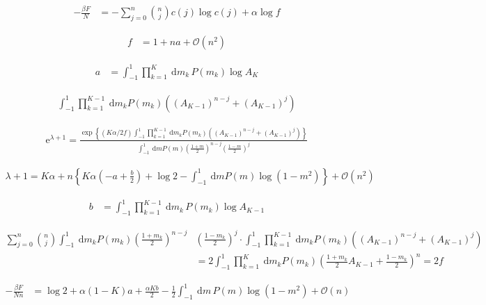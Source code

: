 \documentclass{article}
\begin{document}
\begin{align*}
-\frac{\beta F}{N} &= -\sum_{j=0}^{n} \binom{n}{j} c(j) \log c(j) + \alpha \log f
\tag{D.15}
\end{align*}

\begin{align*}
f &= 1 + n a + \mathcal{O}(n^{2})
\tag{D.16}
\end{align*}

\begin{align*}
a &= \int_{-1}^{1} \prod_{k=1}^{K} \mathrm{~d} m_{k} \, P(m_{k}) \log A_{K}
\tag{D.17}
\end{align*}

\begin{align*}
\int_{-1}^{1} \prod_{k=1}^{K-1} \mathrm{~d} m_{k} P\left(m_{k}\right)\left(\left(A_{K-1}\right)^{n-j}+\left(A_{K-1}\right)^{j}\right) \tag{D.18}
\end{align*}

\begin{align*}
\mathrm{e}^{\lambda+1}=\frac{\exp \left\{(K \alpha / 2 f) \int_{-1}^{1} \prod_{k=1}^{K-1} \mathrm{~d} m_{k} P\left(m_{k}\right)\left(\left(A_{K-1}\right)^{n-j}+\left(A_{K-1}\right)^{j}\right)\right\}}{\int_{-1}^{1} \mathrm{~d} m P(m)\left(\frac{1+m}{2}\right)^{n-j}\left(\frac{1-m}{2}\right)^{j}} \tag{D.19}
\end{align*}

\begin{align*}
\lambda+1=K \alpha+n\left\{K \alpha\left(-a+\frac{b}{2}\right)+\log 2-\int_{-1}^{1} \mathrm{~d} m P(m) \log \left(1-m^{2}\right)\right\}+\mathcal{O}\left(n^{2}\right)
\tag{D.20}
\end{align*}

\begin{align*}
b &= \int_{-1}^{1} \prod_{k=1}^{K-1} \mathrm{~d} m_{k} \, P(m_{k}) \log A_{K-1}
\tag{D.21}
\end{align*}

\begin{align*}
\sum_{j=0}^{n}\binom{n}{j} \int_{-1}^{1} \mathrm{~d} m_{k} P\left(m_{k}\right)\left(\frac{1+m_{k}}{2}\right)^{n-j} & \left(\frac{1-m_{k}}{2}\right)^{j} \cdot \int_{-1}^{1} \prod_{k=1}^{K-1} \mathrm{~d} m_{k} P\left(m_{k}\right)\left(\left(A_{K-1}\right)^{n-j}+\left(A_{K-1}\right)^{j}\right) \\
& =2 \int_{-1}^{1} \prod_{k=1}^{K} \mathrm{~d} m_{k} P\left(m_{k}\right)\left(\frac{1+m_{k}}{2} A_{K-1}+\frac{1-m_{k}}{2}\right)^{n} =2 f
\tag{D.22}
\end{align*}

\begin{align*}
-\frac{\beta F}{N n} &= \log 2 + \alpha(1 - K) a + \frac{\alpha K b}{2} - \frac{1}{2} \int_{-1}^{1} \mathrm{~d} m \, P(m) \log \left( 1 - m^{2} \right) + \mathcal{O}(n)
\tag{D.23}
\end{align*}
\end{document}

